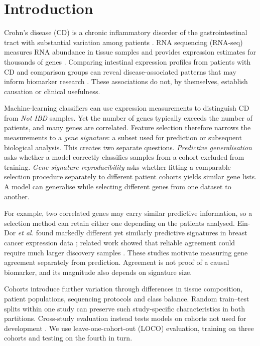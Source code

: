 \section{Introduction}
\label{sec:introduction}
Crohn's disease (CD) is a chronic inflammatory disorder of the gastrointestinal tract with substantial variation among patients \cite{torres2017crohn}. RNA sequencing (RNA-seq) measures RNA abundance in tissue samples and provides expression estimates for thousands of genes \cite{conesa2016survey}. Comparing intestinal expression profiles from patients with CD and comparison groups can reveal disease-associated patterns that may inform biomarker research \cite{montesi2026tentacles}. These associations do not, by themselves, establish causation or clinical usefulness.

Machine-learning classifiers can use expression measurements to distinguish CD from \emph{Not IBD} samples. Yet the number of genes typically exceeds the number of patients, and many genes are correlated. Feature selection therefore narrows the measurements to a \emph{gene signature}: a subset used for prediction or subsequent biological analysis. This creates two separate questions. \emph{Predictive generalisation} asks whether a model correctly classifies samples from a cohort excluded from training. \emph{Gene-signature reproducibility} asks whether fitting a comparable selection procedure separately to different patient cohorts yields similar gene lists. A model can generalise while selecting different genes from one dataset to another.

For example, two correlated genes may carry similar predictive information, so a selection method can retain either one depending on the patients analysed. Ein-Dor \emph{et al.} found markedly different yet similarly predictive signatures in breast cancer expression data \cite{eindor2005outcome}; related work showed that reliable agreement could require much larger discovery samples \cite{eindor2006thousands}. These studies motivate measuring gene agreement separately from prediction. Agreement is not proof of a causal biomarker, and its magnitude also depends on signature size.

Cohorts introduce further variation through differences in tissue composition, patient populations, sequencing protocols and class balance. Random train--test splits within one study can preserve such study-specific characteristics in both partitions. Cross-study evaluation instead tests models on cohorts not used for development \cite{bernau2014cross}. We use leave-one-cohort-out (LOCO) evaluation, training on three cohorts and testing on the fourth in turn.

